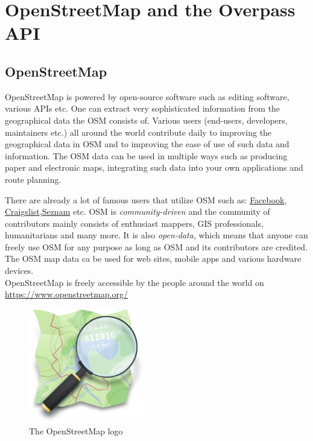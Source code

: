 \section{OpenStreetMap and the Overpass API}
\subsection{OpenStreetMap}
OpenStreetMap is powered by open-source software such as editing software, various APIs etc.
One can extract very sophisticated information from the geographical data the OSM consists of.
Various users (end-users, developers, maintainers etc.) all around the world contribute daily to improving the geographical
data in OSM and to improving the ease of use of such data and information.
The OSM data can be used in multiple ways such as producing paper and electronic maps,
integrating such data into your own applications and route planning.\\
\newline

There are already a lot of famous users that utilize OSM such as:
\href{https://www.facebook.com/}{Facebook},
\href{https://www.craigslist.org/}{Craigslist},\href{https://www.seznam.cz/}{Seznam} etc.
OSM is \textit{community-driven} and the community of contributors mainly consists of enthusiast mappers,
GIS professionals, humanitarians and many more. It is also \textit{open-data}, which means that anyone can freely use
OSM for any purpose as long as OSM and its contributors are credited.
The OSM map data ca be used for web sites, mobile apps and various hardware devices.\\
\newline
OpenStreetMap is freely accessible by the people around the world on \href{https://www.openstreetmap.org/}{https://www.openstreetmap.org/}\\
\newline
\begin{figure}[H]
    \centering
    \includegraphics[width=5cm]{./Figures/Introduction/openstreetmap_logo.png}
    \caption{The OpenStreetMap logo}
\end{figure}
\pagebreak
